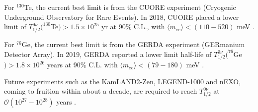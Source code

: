 For $^{130}$Te, the current best limit is from the CUORE experiment (Cryogenic Underground Observatory for Rare Events). In 2018, CUORE placed a lower limit of $T^{0\nu}_{1/2}(^{130}$Te$)>1.5\times 10^{25}$ yr at 90\% C.L., with $\langle m_{ee}\rangle<(110-520)$ meV \cite{alduino2018first}.

For $^{76}$Ge, the current best limit is from the GERDA experiment (GERmanium Detector Array). In 2019, GERDA reported a lower limit half-life of $T^{0\nu}_{1/2}(^{76}$Ge$)>1.8\times 10^{26}$ years at 90\% C.L. with $\langle m_{ee}\rangle<(79-180)$ meV \cite{agostini2020final}.

Future experiments such as the KamLAND2-Zen, LEGEND-1000 and nEXO, coming to fruition within about a decade, are required to reach $T^{0\nu}_{1/2}$ at $\mathcal{O}(10^{27}-10^{28})$ years \cite{dolinski2019neutrinoless}.